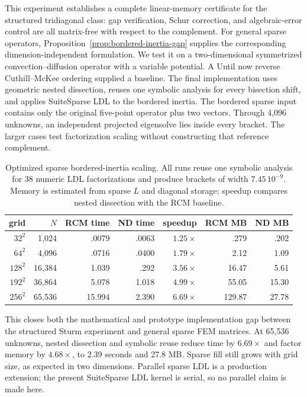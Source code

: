 \documentclass[11pt]{article}
\numberwithin{algorithm}{section}
\theoremstyle{definition}\newtheorem{definition}[theorem]{Definition}
\theoremstyle{remark}\newtheorem{remark}[theorem]{Remark}
\begin{document}
This experiment establishes a complete linear-memory certificate for the
structured tridiagonal class: gap verification, Schur correction, and
algebraic-error control are all matrix-free with respect to the complement.
For general sparse operators, Proposition~\ref{prop:bordered-inertia-gap} supplies the corresponding
dimension-independent formulation.  We test it on a two-dimensional
symmetrized convection--diffusion operator with a variable potential.  A
Until now reverse Cuthill--McKee ordering supplied a baseline.  The final
implementation uses geometric nested dissection, reuses one symbolic analysis
for every bisection shift, and applies SuiteSparse LDL to the bordered
inertia.  The bordered sparse input contains only the original five-point
operator plus two vectors.  Through 4,096 unknowns, an independent projected
eigensolve lies inside every bracket.  The larger cases test factorization
scaling without constructing that reference complement.

\begin{table}[t]
\centering
\caption{Optimized sparse bordered-inertia scaling.  All runs reuse one
symbolic analysis for 38 numeric LDL factorizations and produce brackets of
width $7.45\,10^{-9}$.  Memory is estimated from sparse $L$ and diagonal
storage; speedup compares nested dissection with the RCM baseline.}
\label{tab:bordered-inertia-2d}
\begin{tabular}{rrrrrrr}
\toprule
grid & $N$ & RCM time & ND time & speedup & RCM MB & ND MB\\
\midrule
$32^2$  & 1,024  & .0079 & .0063 & $1.25\times$ & .279 & .202\\
$64^2$  & 4,096  & .0716 & .0400 & $1.79\times$ & 2.12 & 1.09\\
$128^2$ & 16,384 & 1.039 & .292 & $3.56\times$ & 16.47 & 5.61\\
$192^2$ & 36,864 & 5.078 & 1.018 & $4.99\times$ & 55.05 & 15.30\\
$256^2$ & 65,536 & 15.994 & 2.390 & $6.69\times$ & 129.87 & 27.78\\
\bottomrule
\end{tabular}
\end{table}

This closes both the mathematical and prototype implementation gap between the
structured Sturm experiment and general sparse FEM matrices.  At 65,536
unknowns, nested dissection and symbolic reuse reduce time by $6.69\times$ and
factor memory by $4.68\times$, to 2.39 seconds and 27.8 MB.  Sparse fill still
grows with grid size, as expected in two dimensions.  Parallel sparse LDL is a
production extension; the present SuiteSparse LDL kernel is serial, so no
parallel claim is made here.
\end{document}
